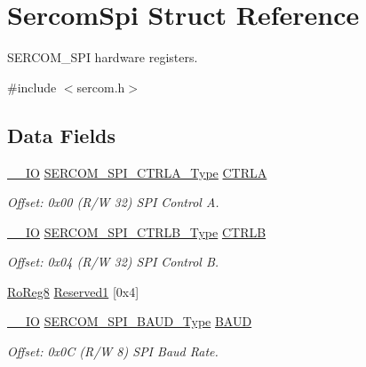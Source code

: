 \hypertarget{struct_sercom_spi}{}\section{Sercom\+Spi Struct Reference}
\label{struct_sercom_spi}


S\+E\+R\+C\+O\+M\+\_\+\+S\+PI hardware registers.  




{\ttfamily \#include $<$sercom.\+h$>$}

\subsection*{Data Fields}
\begin{DoxyCompactItemize}
\item 
\mbox{\hyperlink{core__cm0plus_8h_aec43007d9998a0a0e01faede4133d6be}{\+\_\+\+\_\+\+IO}} \mbox{\hyperlink{union_s_e_r_c_o_m___s_p_i___c_t_r_l_a___type}{S\+E\+R\+C\+O\+M\+\_\+\+S\+P\+I\+\_\+\+C\+T\+R\+L\+A\+\_\+\+Type}} \mbox{\hyperlink{struct_sercom_spi_ae4ec96c1599229f535843280c58699ef}{C\+T\+R\+LA}}
\begin{DoxyCompactList}\small\item\em Offset\+: 0x00 (R/W 32) S\+PI Control A. \end{DoxyCompactList}\item 
\mbox{\hyperlink{core__cm0plus_8h_aec43007d9998a0a0e01faede4133d6be}{\+\_\+\+\_\+\+IO}} \mbox{\hyperlink{union_s_e_r_c_o_m___s_p_i___c_t_r_l_b___type}{S\+E\+R\+C\+O\+M\+\_\+\+S\+P\+I\+\_\+\+C\+T\+R\+L\+B\+\_\+\+Type}} \mbox{\hyperlink{struct_sercom_spi_a7986bae5cd45b94105f935f0fb951356}{C\+T\+R\+LB}}
\begin{DoxyCompactList}\small\item\em Offset\+: 0x04 (R/W 32) S\+PI Control B. \end{DoxyCompactList}\item 
\mbox{\hyperlink{group___s_a_m_d21_e15_a__definitions_ga0d957f1433aaf5d70e4dc2b68288442d}{Ro\+Reg8}} \mbox{\hyperlink{struct_sercom_spi_a1106a1fe7c5fa01a183c54b4b992a7f0}{Reserved1}} \mbox{[}0x4\mbox{]}
\item 
\mbox{\hyperlink{core__cm0plus_8h_aec43007d9998a0a0e01faede4133d6be}{\+\_\+\+\_\+\+IO}} \mbox{\hyperlink{union_s_e_r_c_o_m___s_p_i___b_a_u_d___type}{S\+E\+R\+C\+O\+M\+\_\+\+S\+P\+I\+\_\+\+B\+A\+U\+D\+\_\+\+Type}} \mbox{\hyperlink{struct_sercom_spi_aa4a9783b1bc052a33af3e36c58c762af}{B\+A\+UD}}
\begin{DoxyCompactList}\small\item\em Offset\+: 0x0C (R/W 8) S\+PI Baud Rate. \end{DoxyCompactList}\item 

\end{DoxyCompactItemize}
